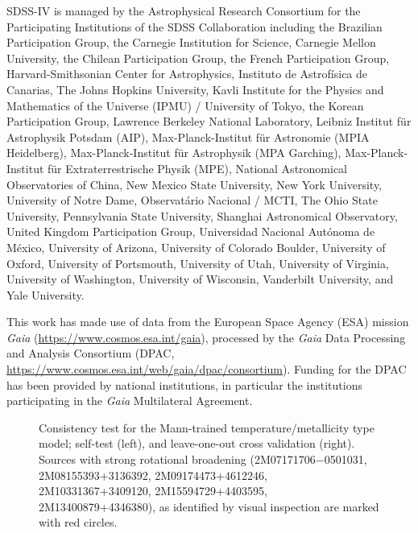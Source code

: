 \documentclass[modern]{aastex62}
\begin{document}
SDSS-IV is managed by the Astrophysical Research Consortium for the 
Participating Institutions of the SDSS Collaboration including the 
Brazilian Participation Group, the Carnegie Institution for Science, 
Carnegie Mellon University, the Chilean Participation Group, the French Participation Group, Harvard-Smithsonian Center for Astrophysics, 
Instituto de Astrof\'isica de Canarias, The Johns Hopkins University, 
Kavli Institute for the Physics and Mathematics of the Universe (IPMU) / 
University of Tokyo, the Korean Participation Group, Lawrence Berkeley National Laboratory, 
Leibniz Institut f\"ur Astrophysik Potsdam (AIP),  
Max-Planck-Institut f\"ur Astronomie (MPIA Heidelberg), 
Max-Planck-Institut f\"ur Astrophysik (MPA Garching), 
Max-Planck-Institut f\"ur Extraterrestrische Physik (MPE), 
National Astronomical Observatories of China, New Mexico State University, 
New York University, University of Notre Dame, 
Observat\'ario Nacional / MCTI, The Ohio State University, 
Pennsylvania State University, Shanghai Astronomical Observatory, 
United Kingdom Participation Group,
Universidad Nacional Aut\'onoma de M\'exico, University of Arizona, 
University of Colorado Boulder, University of Oxford, University of Portsmouth, 
University of Utah, University of Virginia, University of Washington, University of Wisconsin, 
Vanderbilt University, and Yale University.

This work has made use of data from the European Space Agency (ESA) mission
{\it Gaia} (\url{https://www.cosmos.esa.int/gaia}), processed by the {\it Gaia}
Data Processing and Analysis Consortium (DPAC,
\url{https://www.cosmos.esa.int/web/gaia/dpac/consortium}). Funding for the DPAC
has been provided by national institutions, in particular the institutions
participating in the {\it Gaia} Multilateral Agreement.


\newpage

\begin{figure}[ht]
\caption{Consistency test for the Mann-trained temperature/metallicity type model; self-test (left), and leave-one-out cross validation (right). Sources with strong rotational broadening (2M07171706−0501031, 2M08155393+3136392, 2M09174473+4612246, 2M10331367+3409120, 2M15594729+4403595, 2M13400879+4346380), as identified by visual inspection are marked with red circles.} \label{fig:mann_validation}
\end{figure}
\end{document}
